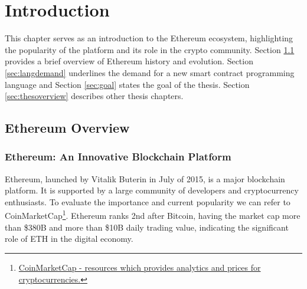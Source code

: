 \chapter{Introduction}
\label{chap:intro}



This chapter serves as an introduction to the Ethereum ecosystem, highlighting the popularity of the platform and its role in the crypto community. 
Section \ref{sec:ethoverview} provides a brief overview of Ethereum history and evolution. Section \ref{sec:langdemand} underlines the demand for a new smart contract programming language and Section \ref{sec:goal} states the goal of the thesis. Section \ref{sec:thesoverview} describes other thesis chapters.


\section{Ethereum Overview}
\label{sec:ethoverview}

\subsection{Ethereum: An Innovative Blockchain Platform}
Ethereum, launched by Vitalik Buterin in July of 2015, is a major blockchain platform. It is supported by a large community of developers and cryptocurrency enthusiasts. To evaluate the importance and current popularity we can refer to CoinMarketCap\footnote{\href{https://coinmarketcap.com/}{CoinMarketCap - resources which provides analytics and prices for cryptocurrencies.}}. Ethereum ranks 2nd after Bitcoin, having the market cap more than \$380B and more than \$10B daily trading value, indicating the significant role of ETH in the digital economy.

